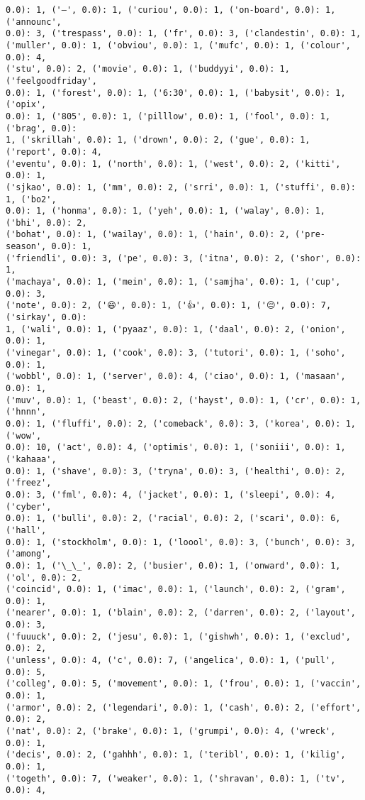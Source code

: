 \documentclass[11pt]{article}
\begin{document}
\begin{Verbatim}[commandchars=\\\{\}]
0.0): 1, ('–', 0.0): 1, ('curiou', 0.0): 1, ('on-board', 0.0): 1, ('announc',
0.0): 3, ('trespass', 0.0): 1, ('fr', 0.0): 3, ('clandestin', 0.0): 1,
('muller', 0.0): 1, ('obviou', 0.0): 1, ('mufc', 0.0): 1, ('colour', 0.0): 4,
('stu', 0.0): 2, ('movie', 0.0): 1, ('buddyyi', 0.0): 1, ('feelgoodfriday',
0.0): 1, ('forest', 0.0): 1, ('6:30', 0.0): 1, ('babysit', 0.0): 1, ('opix',
0.0): 1, ('805', 0.0): 1, ('pilllow', 0.0): 1, ('fool', 0.0): 1, ('brag', 0.0):
1, ('skrillah', 0.0): 1, ('drown', 0.0): 2, ('gue', 0.0): 1, ('report', 0.0): 4,
('eventu', 0.0): 1, ('north', 0.0): 1, ('west', 0.0): 2, ('kitti', 0.0): 1,
('sjkao', 0.0): 1, ('mm', 0.0): 2, ('srri', 0.0): 1, ('stuffi', 0.0): 1, ('bo2',
0.0): 1, ('honma', 0.0): 1, ('yeh', 0.0): 1, ('walay', 0.0): 1, ('bhi', 0.0): 2,
('bohat', 0.0): 1, ('wailay', 0.0): 1, ('hain', 0.0): 2, ('pre-season', 0.0): 1,
('friendli', 0.0): 3, ('pe', 0.0): 3, ('itna', 0.0): 2, ('shor', 0.0): 1,
('machaya', 0.0): 1, ('mein', 0.0): 1, ('samjha', 0.0): 1, ('cup', 0.0): 3,
('note', 0.0): 2, ('😄', 0.0): 1, ('👍', 0.0): 1, ('😔', 0.0): 7, ('sirkay', 0.0):
1, ('wali', 0.0): 1, ('pyaaz', 0.0): 1, ('daal', 0.0): 2, ('onion', 0.0): 1,
('vinegar', 0.0): 1, ('cook', 0.0): 3, ('tutori', 0.0): 1, ('soho', 0.0): 1,
('wobbl', 0.0): 1, ('server', 0.0): 4, ('ciao', 0.0): 1, ('masaan', 0.0): 1,
('muv', 0.0): 1, ('beast', 0.0): 2, ('hayst', 0.0): 1, ('cr', 0.0): 1, ('hnnn',
0.0): 1, ('fluffi', 0.0): 2, ('comeback', 0.0): 3, ('korea', 0.0): 1, ('wow',
0.0): 10, ('act', 0.0): 4, ('optimis', 0.0): 1, ('soniii', 0.0): 1, ('kahaaa',
0.0): 1, ('shave', 0.0): 3, ('tryna', 0.0): 3, ('healthi', 0.0): 2, ('freez',
0.0): 3, ('fml', 0.0): 4, ('jacket', 0.0): 1, ('sleepi', 0.0): 4, ('cyber',
0.0): 1, ('bulli', 0.0): 2, ('racial', 0.0): 2, ('scari', 0.0): 6, ('hall',
0.0): 1, ('stockholm', 0.0): 1, ('loool', 0.0): 3, ('bunch', 0.0): 3, ('among',
0.0): 1, ('\_\_', 0.0): 2, ('busier', 0.0): 1, ('onward', 0.0): 1, ('ol', 0.0): 2,
('coincid', 0.0): 1, ('imac', 0.0): 1, ('launch', 0.0): 2, ('gram', 0.0): 1,
('nearer', 0.0): 1, ('blain', 0.0): 2, ('darren', 0.0): 2, ('layout', 0.0): 3,
('fuuuck', 0.0): 2, ('jesu', 0.0): 1, ('gishwh', 0.0): 1, ('exclud', 0.0): 2,
('unless', 0.0): 4, ('c', 0.0): 7, ('angelica', 0.0): 1, ('pull', 0.0): 5,
('colleg', 0.0): 5, ('movement', 0.0): 1, ('frou', 0.0): 1, ('vaccin', 0.0): 1,
('armor', 0.0): 2, ('legendari', 0.0): 1, ('cash', 0.0): 2, ('effort', 0.0): 2,
('nat', 0.0): 2, ('brake', 0.0): 1, ('grumpi', 0.0): 4, ('wreck', 0.0): 1,
('decis', 0.0): 2, ('gahhh', 0.0): 1, ('teribl', 0.0): 1, ('kilig', 0.0): 1,
('togeth', 0.0): 7, ('weaker', 0.0): 1, ('shravan', 0.0): 1, ('tv', 0.0): 4,

\end{Verbatim}
\end{document}
